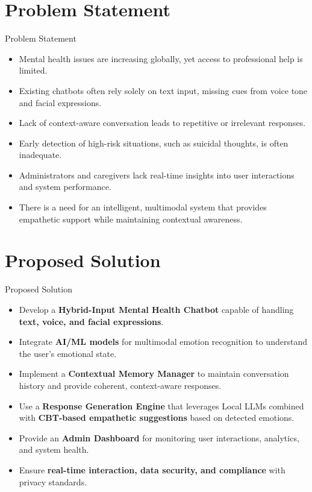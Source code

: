 \documentclass{beamer}
\begin{document}
\section{Problem Statement}
\begin{frame}{Problem Statement}
    \justifying
    \large
    \begin{itemize}
        \item Mental health issues are increasing globally, yet access to professional help is limited.
        \item Existing chatbots often rely solely on text input, missing cues from voice tone and facial expressions.
        \item Lack of context-aware conversation leads to repetitive or irrelevant responses.
        \item Early detection of high-risk situations, such as suicidal thoughts, is often inadequate.
        \item Administrators and caregivers lack real-time insights into user interactions and system performance.
        \item There is a need for an intelligent, multimodal system that provides empathetic support while maintaining contextual awareness.
    \end{itemize}
\end{frame}

\section{Proposed Solution}
\begin{frame}{Proposed Solution}
    \justifying
    \normalsize
    \begin{itemize}
        \item Develop a \textbf{Hybrid-Input Mental Health Chatbot} capable of handling \textbf{text, voice, and facial expressions}.
        \item Integrate \textbf{AI/ML models} for multimodal emotion recognition to understand the user's emotional state.
        \item Implement a \textbf{Contextual Memory Manager} to maintain conversation history and provide coherent, context-aware responses.
        \item Use a \textbf{Response Generation Engine} that leverages Local LLMs combined with \textbf{CBT-based empathetic suggestions} based on detected emotions.
        \item Provide an \textbf{Admin Dashboard} for monitoring user interactions, analytics, and system health.
        \item Ensure \textbf{real-time interaction, data security, and compliance} with privacy standards.
    \end{itemize}
\end{frame}
\end{document}
